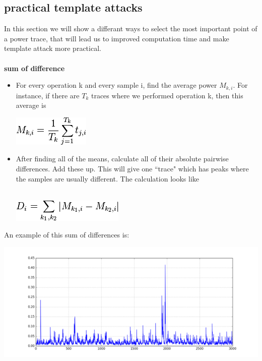     \subsection{practical template attacks}
    In this section we will show a differant ways to select the most important
    point of a power trace, that will lead us to improved computation time and
    make template attack more practical.\\
    \\
    \textbf{sum of difference}
       \begin{itemize}
          \item For every operation k and every sample i, find the average power
          $M_{k, i}$. For instance, if there are $T_k$ traces where we performed
          operation k, then this average is\\
              \begin{minipage}{\linewidth}
              \centering
              \includegraphics[scale=0.7]{images/Lecture_5/pic9.png}
              \end{minipage}
           
          \item After finding all of the means, calculate all of their absolute
          pairwise differences. Add these up. This will give one ``trace" which
          has peaks where the samples are usually different. The calculation
          looks like\\
          \\
              \begin{minipage}{\linewidth}
              \centering
              \includegraphics[scale=0.7]{images/Lecture_5/pic10.png}
              \end{minipage}
       \end{itemize}
        An example of this sum of differences is:\\
              \begin{minipage}{\linewidth}
              \centering
              \includegraphics[scale=0.7]{images/Lecture_5/pic11.png}
              \end{minipage}
        \\

